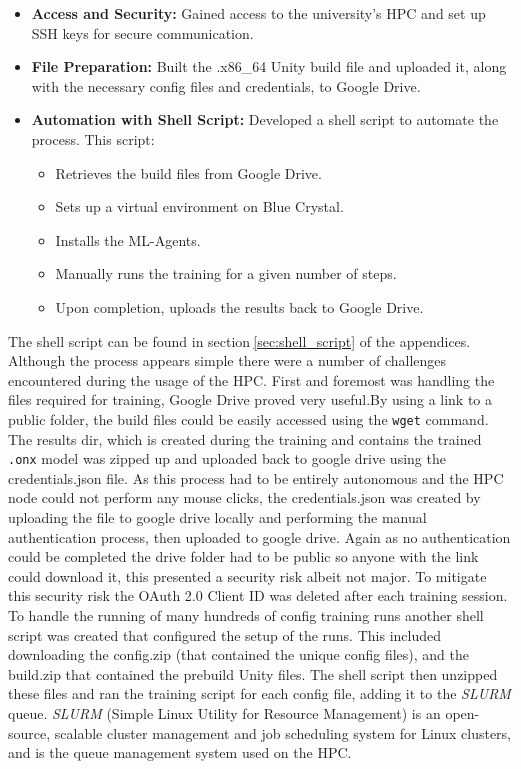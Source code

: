 \begin{itemize}
    \item \textbf{Access and Security:} Gained access to the university's HPC and set up SSH keys for secure communication.
    \item \textbf{File Preparation:} Built the .x86\_64 Unity build file and uploaded it, along with the necessary config files and credentials, to Google Drive.
    \item \textbf{Automation with Shell Script:} Developed a shell script to automate the process. This script:
    \begin{itemize}
        \item Retrieves the build files from Google Drive.
        \item Sets up a virtual environment on Blue Crystal.
        \item Installs the ML-Agents.
        \item Manually runs the training for a given number of steps.
        \item Upon completion, uploads the results back to Google Drive.
    \end{itemize}
\end{itemize}

The shell script can be found in section$~$\ref{sec:shell_script} of the appendices. Although the process appears simple there were a number of challenges encountered during the usage of the HPC. First and foremost was handling the files required for training, Google Drive proved very useful.By using a link to a public folder, the build files could be easily accessed using the \texttt{wget} command. The results dir, which is created during the training and contains the trained \texttt{.onx} model was zipped up and uploaded back to google drive using the credentials.json file. As this process had to be entirely autonomous and the HPC node could not perform any mouse clicks, the credentials.json was created by uploading the file to google drive locally and performing the manual authentication process, then uploaded to google drive. Again as no authentication could be completed the drive folder had to be public so anyone with the link could download it, this presented a security risk albeit not major. To mitigate this security risk the OAuth 2.0 Client ID was deleted after each training session. To handle the running of many hundreds of config training runs another shell script was created that configured the setup of the runs. This included 
downloading the config.zip (that contained the unique config files), and the build.zip that contained the prebuild Unity files. The shell script then unzipped these files and ran the training script for each config file, adding it to the \textit{SLURM} queue. \textit{SLURM} (Simple Linux Utility for Resource Management) is an open-source, scalable cluster management and job scheduling system for Linux clusters, and is the queue management system used on the HPC. 


